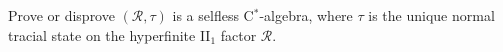 Prove or disprove $(\mathcal R, \tau)$ is a selfless C$^*$-algebra, where $\tau$ is the unique normal tracial state on the hyperfinite II$_1$ factor $\mathcal R$.
